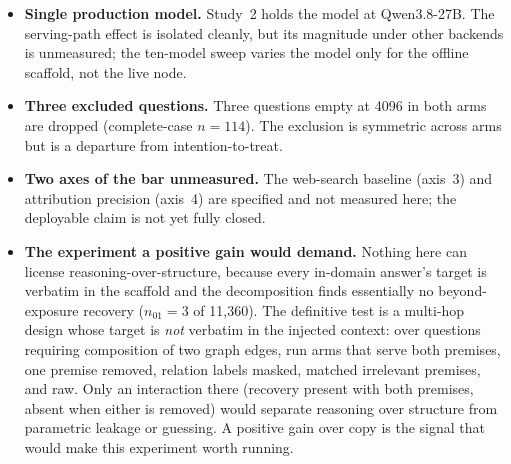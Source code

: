 \documentclass[10pt,twocolumn]{article}
\begin{document}
\begin{itemize}[topsep=2pt,itemsep=2pt,leftmargin=1.4em]
clears the floor could change the engagement and thin-set numbers.
\item \textbf{Single production model.} Study~2 holds the model at Qwen3.8-27B. The serving-path effect
is isolated cleanly, but its magnitude under other backends is unmeasured; the ten-model sweep varies
the model only for the offline scaffold, not the live node.
\item \textbf{Three excluded questions.} Three questions empty at 4096 in both arms are dropped
(complete-case $n=114$). The exclusion is symmetric across arms but is a departure from intention-to-treat.
\item \textbf{Two axes of the bar unmeasured.} The web-search baseline (axis~3) and attribution
precision (axis~4) are specified and not measured here; the deployable claim is not yet fully closed.
\item \textbf{The experiment a positive gain would demand.} Nothing here can license
reasoning-over-structure, because every in-domain answer's target is verbatim in the scaffold and the
decomposition finds essentially no beyond-exposure recovery ($n_{01}=3$ of 11{,}360). The definitive
test is a multi-hop design whose target is \emph{not} verbatim in the injected context: over questions
requiring composition of two graph edges, run arms that serve both premises, one premise removed,
relation labels masked, matched irrelevant premises, and raw. Only an interaction there (recovery
present with both premises, absent when either is removed) would separate reasoning over structure from
parametric leakage or guessing. A positive gain over copy is the signal that would make this experiment
worth running.
\end{itemize}
\end{document}
